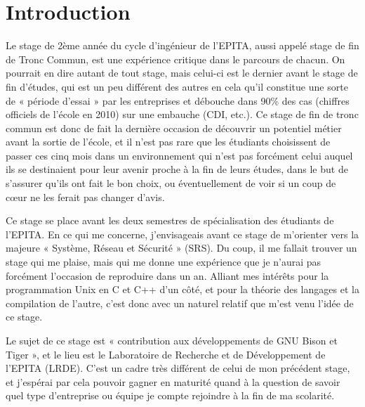 \documentclass[a4paper,11pt,twoside,final]{article}
\begin{document}
  
  \cleardoublepage %
  \tableofcontents %
  \sloppy          %
  \cleardoublepage

  \setcounter{page}{1}
  \section*{Introduction} %

  Le stage de 2ème année du cycle d'ingénieur de l'EPITA, aussi appelé stage de
  fin de Tronc Commun, est une expérience critique dans le parcours de chacun.
  On pourrait en dire autant de tout stage, mais celui-ci est le dernier avant
  le stage de fin d'études, qui est un peu différent des autres en cela qu'il
  constitue une sorte de « période d'essai » par les entreprises et débouche
  dans 90\% des cas (chiffres officiels de l'école en 2010) sur une embauche
  (CDI, etc.). Ce stage de fin de tronc commun est donc de fait la dernière
  occasion de découvrir un potentiel métier avant la sortie de l'école, et il
  n'est pas rare que les étudiants choisissent de passer ces cinq mois dans un
  environnement qui n'est pas forcément celui auquel ils se destinaient pour
  leur avenir proche à la fin de leurs études, dans le but de s'assurer qu'ils
  ont fait le bon choix, ou éventuellement de voir si un coup de cœur ne les
  ferait pas changer d'avis.

  Ce stage se place avant les deux semestres de spécialisation des étudiants de
  l'EPITA\@. En ce qui me concerne, j'envisageais avant ce stage de m'orienter
  vers la majeure « Système, Réseau et Sécurité » (SRS). Du coup, il me fallait
  trouver un stage qui me plaise, mais qui me donne une expérience que je
  n'aurai pas forcément l'occasion de reproduire dans un an. Alliant mes
  intérêts pour la programmation Unix en C et C++ d'un côté, et pour la théorie
  des langages et la compilation de l'autre, c'est donc avec un naturel relatif
  que m'est venu l'idée de ce stage.

  Le sujet de ce stage est « contribution aux développements de GNU Bison et
  Tiger », et le lieu est le Laboratoire de Recherche et de Développement de
  l'EPITA (LRDE). C'est un cadre très différent de celui de mon précédent
  stage, et j'espérai par cela pouvoir gagner en maturité quand à la question
  de savoir quel type d'entreprise ou équipe je compte rejoindre à la fin de
  ma scolarité.
\end{document}
